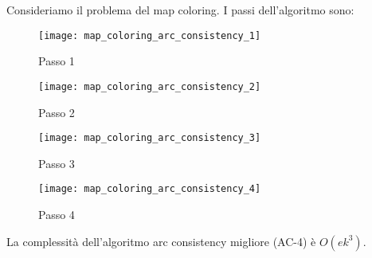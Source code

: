 \documentclass[a4paper]{article}
\begin{document}
\begin{example}
  Consideriamo il problema del map coloring. I passi dell'algoritmo sono:
  \begin{figure}[H]
    \centering
    \texttt{[image: map\_coloring\_arc\_consistency\_1]}
    \caption{Passo 1}
  \end{figure}
  \begin{figure}[H]
    \centering
    \texttt{[image: map\_coloring\_arc\_consistency\_2]}
    \caption{Passo 2}
  \end{figure}
  \begin{figure}[H]
    \centering
    \texttt{[image: map\_coloring\_arc\_consistency\_3]}
    \caption{Passo 3}
  \end{figure}
  \begin{figure}[H]
    \centering
    \texttt{[image: map\_coloring\_arc\_consistency\_4]}
    \caption{Passo 4}
  \end{figure}
\end{example}

\vspace{1em}
\noindent
La complessità dell'algoritmo arc consistency migliore (AC-4) è \( O(ek^3) \).
\end{document}
